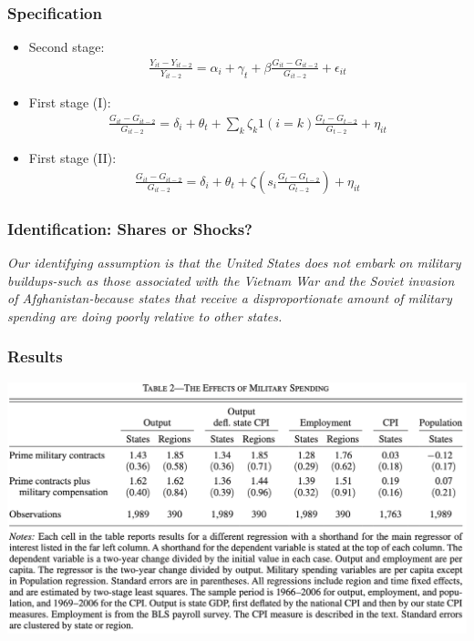 \documentclass[english,xcolor=svgnames]{beamer}
\begin{document}
\begin{frame}
\frametitle[alignment=center]{Specification}
\begin{itemize}
	\item Second stage:
	\begin{align*}
		\frac{Y_{it}-Y_{it-2}}{Y_{it-2}} = \alpha_i + \gamma_t + \beta \frac{G_{it}-G_{it-2}}{G_{it-2}}  + \epsilon_{it}
	\end{align*}
	\item First stage (I):
	\begin{align*}
		\frac{G_{it}-G_{it-2}}{G_{it-2}}  = \delta_i + \theta_t + \sum_k\zeta_k 1(i=k)  \frac{G_{t}-G_{t-2}}{G_{t-2}}  + \eta_{it}
	\end{align*}
	\item First stage (II):
	\begin{align*}
		\frac{G_{it}-G_{it-2}}{G_{it-2}}  = \delta_i + \theta_t + \zeta \left(s_i \frac{G_{t}-G_{t-2}}{G_{t-2}}\right)  + \eta_{it}
	\end{align*}
\end{itemize}
\end{frame}


\begin{frame}
\frametitle[alignment=center]{Identification: Shares or Shocks?}
\emph{Our identifying assumption is that the United States does not embark on military buildups-such as those associated with the Vietnam War and the Soviet invasion of Afghanistan-because states that receive a disproportionate amount of military spending are doing poorly relative to other states.}
\end{frame}

\begin{frame}
\frametitle[alignment=center]{Results}
\centering
\includegraphics[scale=0.5]{figures/NSTAB2.png}
\end{frame}
\end{document}

